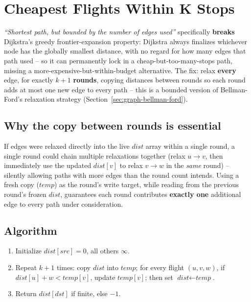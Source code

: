 \section{Cheapest Flights Within K Stops}
\label{sec:graph-cheapest-flights-k-stops}


\begin{patternbox}
\emph{``Shortest path, but bounded by the number of edges used''}
specifically \textbf{breaks} Dijkstra's greedy frontier-expansion
property: Dijkstra always finalizes whichever node has the globally
smallest distance, with no regard for how many edges that path used --
so it can permanently lock in a cheap-but-too-many-stops path, missing
a more-expensive-but-within-budget alternative. The fix: relax
\textbf{every} edge, for exactly $k{+}1$ \textbf{rounds}, copying
distances between rounds so each round adds at most one new edge to
every path -- this is a bounded version of Bellman-Ford's relaxation
strategy (Section~\ref{sec:graph-bellman-ford}).
\end{patternbox}

\subsection*{Why the copy between rounds is essential}

If edges were relaxed directly into the live $\textit{dist}$ array
within a single round, a single round could chain multiple
relaxations together (relax $u\to v$, then immediately use the updated
$\textit{dist}[v]$ to relax $v \to w$ in the \emph{same} round) --
silently allowing paths with more edges than the round count intends.
Using a fresh copy ($\textit{temp}$) as the round's write target, while
reading from the previous round's frozen $\textit{dist}$, guarantees
each round contributes \textbf{exactly one} additional edge to every
path under consideration.

\subsection*{Algorithm}

\begin{enumerate}
  \item Initialize $\textit{dist}[\textit{src}]=0$, all others
        $\infty$.
  \item Repeat $k{+}1$ times: copy $\textit{dist}$ into
        $\textit{temp}$; for every flight $(u,v,w)$, if
        $\textit{dist}[u] + w < \textit{temp}[v]$, update
        $\textit{temp}[v]$; then set $\textit{dist} \gets \textit{temp}$.
  \item Return $\textit{dist}[\textit{dst}]$ if finite, else $-1$.
\end{enumerate}

